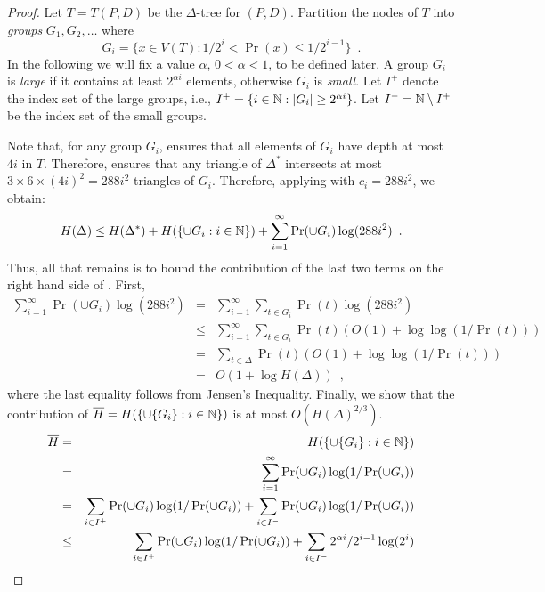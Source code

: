 \documentclass[lotsofwhite]{patmorin}
\begin{document}
\begin{proof}
Let $T=T(P,D)$ be the $\Delta$-tree for $(P,D)$.
Partition the nodes of $T$ into
\emph{groups} $G_1,G_2,\ldots$ where
\[
	G_i = \{x\in V(T) : 1/2^{i} < \Pr(x) \le 1/2^{i-1} \} \enspace .
\]
In the following we will fix a value $\alpha$, $0 < \alpha < 1$, to be
defined later.  A group $G_i$ is \emph{large} if it contains at least
$2^{\alpha i}$ elements, otherwise $G_i$ is \emph{small}.  Let $I^+$
denote the index set of the large groups, i.e., $I^{+}=\{i\in\mathbb{N} :
|G_i| \ge 2^{\alpha i}\}$.  Let $I^{-}= \mathbb{N}\setminus I^+$ be the index
set of the small groups.

Note that, for any group $G_i$,  ensures that all
elements of $G_i$ have depth at most $4i$ in $T$.  Therefore, 
 ensures that any triangle of
$\Delta^*$ intersects at most $3\times 6\times (4i)^2=288i^2$ 
triangles of $G_{i}$.  Therefore,
applying  with $c_{i}=288i^2$, we obtain:
\begin{equation} 
 H(\Delta) \le 
   H(\Delta^*) + H(\{{\cup G_{i}} : i\in\N\}) 
   + \sum_{i=1}^{\infty}\Pr(\cup G_{i})\log(288i^2)  \enspace .
   \eqlabelx{doit}
\end{equation}
Thus, all that remains is to bound the contribution of the last two
terms on the right hand side of .  First,
\begin{eqnarray*}
   \sum_{i=1}^{\infty}\Pr(\cup G_{i})\log(288i^2)
   &   =  & \sum_{i=1}^\infty\sum_{t\in G_i}\Pr(t)\log(288i^2) \\
   &  \le  & \sum_{i=1}^\infty\sum_{t\in G_i}\Pr(t)(O(1)+\log\log(1/\Pr(t))) \\
    &  =  & \sum_{t\in\Delta} \Pr(t) (O(1)+\log\log(1/\Pr(t))) \\
    &  =  & O(1+\log H(\Delta)) \enspace ,
\end{eqnarray*}
where the last equality follows from Jensen's Inequality.
Finally, we show that the contribution of $\overline
H=H(\{\cup\{G_{i}\} : i\in\mathbb{N}\})$ is at most
$O(H(\Delta)^{2/3})$. 
\begin{eqnarray*}
\overline H 
 &  =  & H(\{\cup\{G_{i}\} : i\in\N\}) \\
 &  =  & \sum_{i=1}^\infty\Pr(\cup G_{i})\log(1/\Pr(\cup G_{i})) \\
 &  =  & \sum_{i\in I^+}\Pr(\cup G_{i})\log(1/\Pr(\cup G_{i})) 
         + \sum_{i\in I^-}\Pr(\cup G_{i})\log(1/\Pr(\cup G_{i})) \\
 & \le & \sum_{i\in I^+}\Pr(\cup G_{i})\log(1/\Pr(\cup G_{i})) 
         + \sum_{i\in I^-}2^{\alpha i}/2^{i-1}\log(2^{i}) \\

\end{eqnarray*}
\end{proof}
\end{document}
